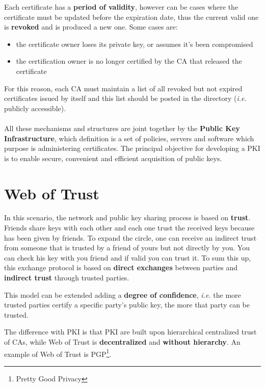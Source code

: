 \documentclass[oneside]{academica}
\begin{document}
Each certificate has a \textbf{period of validity}, however can be cases where the certificate must be updated before the expiration date, thus the current valid one is \textbf{revoked} and is produced a new one.
Some cases are:
\begin{itemize}
  \item the certificate owner loses its private key, or assumes it's been compromised
  \item the certification owner is no longer certified by the CA that released the certificate
\end{itemize}
For this reason, each CA must maintain a list of all revoked but not expired certificates issued by itself and this list should be posted in the directory (\textit{i.e.} publicly accessible).
\\\\
All these mechanisms and structures are joint together by the \textbf{Public Key Infrastructure}, which definition is a set of policies, servers and software which purpose is administering certificates.
The principal objective for developing a PKI is to enable secure, convenient and efficient acquisition of public keys.


\section{Web of Trust}

In this scenario, the network and public key sharing process is based on \textbf{trust}.
Friends share keys with each other and each one trust the received keys because has been given by friends.
To expand the circle, one can receive an indirect trust from someone that is trusted by a friend of yours but not directly by you.
You can check his key with you friend and if valid you can trust it.
To sum this up, this exchange protocol is based on \textbf{direct exchanges} between parties and \textbf{indirect trust} through trusted parties.

This model can be extended adding a \textbf{degree of confidence}, \textit{i.e.} the more trusted parties certify a specific party's public key, the more that party can be trusted.

The difference with PKI is that PKI are built upon hierarchical centralized trust of CAs, while Web of Trust is \textbf{decentralized} and \textbf{without hierarchy}.
An example of Web of Trust is PGP\footnote{Pretty Good Privacy}.
\end{document}
